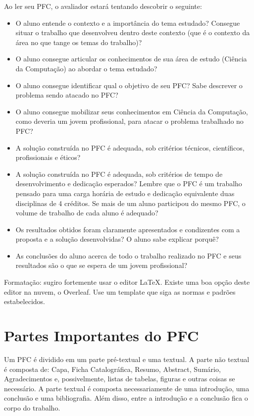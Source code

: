Ao ler seu PFC, o avaliador estará tentando descobrir o seguinte:
\begin{itemize}
\item O aluno entende o contexto e a importância do tema estudado? Consegue situar o trabalho que desenvolveu dentro deste contexto (que é o contexto da área no que tange os temas do trabalho)?

\item O aluno consegue articular os conhecimentos de sua área de estudo (Ciência da Computação) ao abordar o tema estudado?

\item O aluno consegue identificar qual o objetivo de seu PFC? Sabe descrever o problema sendo atacado no PFC?

\item O aluno consegue mobilizar seus conhecimentos em Ciência da Computação, como deveria um jovem profissional, para atacar o problema trabalhado no PFC?

\item A solução construída no PFC é adequada, sob critérios técnicos, científicos, profissionais e éticos?

\item A solução construída no PFC é adequada, sob critérios de tempo de desenvolvimento e dedicação esperados? Lembre que o PFC é um trabalho pensado para uma carga horária de estudo e dedicação equivalente duas disciplinas de 4 créditos. Se mais de um aluno participou do mesmo PFC, o volume de trabalho de cada aluno é adequado?

\item Os resultados obtidos foram claramente apresentados e condizentes com a proposta e a solução desenvolvidas? O aluno sabe explicar porquê?

\item As conclusões do aluno acerca de todo o trabalho realizado no PFC e seus resultados são o que se espera de um jovem profissional?
\end{itemize}

Formatação: sugiro fortemente usar o editor LaTeX. Existe uma boa opção deste editor na nuvem, o Overleaf. Use um template que siga as normas e padrões estabelecidos.

\section{Partes Importantes do PFC}

Um PFC é dividido em um parte pré-textual e uma textual. A parte não textual é composta de: Capa, Ficha Catalográfica, Resumo, Abstract, Sumário, Agradecimentos e, possivelmente, listas de tabelas, figuras e outras coisas se necessário. A parte textual é composta necessariamente de uma introdução, uma conclusão e uma bibliografia. Além disso, entre a introdução e a conclusão fica o corpo do trabalho.

